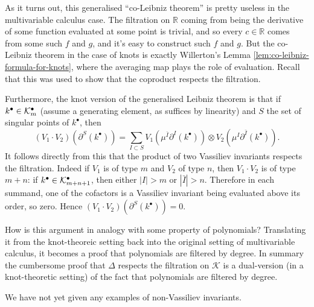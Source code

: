 \begin{remark}
	As it turns out, this generalised ``co-Leibniz theorem'' is pretty useless in the multivariable calculus case. The filtration on \(\mathbb{R}\) coming from being the derivative of some function evaluated at some point is trivial, and so every \(c \in \mathbb{R}\) comes from some such \(f\) and \(g\), and it's easy to construct such \(f\) and \(g\). But the co-Leibniz theorem in the case of knots is exactly Willerton's Lemma \ref{lem:co-leibniz-formula-for-knots}, where the averaging map plays the role of evaluation. Recall that this was used to show that the coproduct respects the filtration.

	Furthermore, the knot version of the generalised Leibniz theorem \cite{vassiliev-invariants-and-the-hopf-algebra-of-chord-diagrams} is that if \(k^{\bullet} \in \mathcal{K}^{\bullet}_{m}\) (assume a generating element, as suffices by linearity) and \(S\) the set of singular points of \(k^{\bullet}\), then
	\[
		(V_{1} \cdot V_{2})(\partial^{S}(k^{\bullet}))
		=
		\sum_{I \subset S}
		V_{1}(\mu^{\bar{I}}\partial^{I}(k^{\bullet}))
		\otimes
		V_{2}(\mu^{I}\partial^{\bar{I}}(k^{\bullet})).
	\]
	It follows directly from this that the product of two Vassiliev invariants respects the filtration. Indeed if \(V_{1}\) is of type \(m\) and \(V_{2}\) of type \(n\), then \(V_{1} \cdot V_{2}\) is of type \(m + n\): if \(k^{\bullet} \in \mathcal{K}^{\bullet}_{m + n + 1}\), then either \(|I| > m\) or \(|\bar{I}| > n\). Therefore in each summand, one of the cofactors is a Vassiliev invariant being evaluated above its order, so zero. Hence \((V_{1} \cdot V_{2})(\partial^{S}(k^{\bullet})) = 0\).

	How is this argument in analogy with some property of polynomials? Translating it from the knot-theoreic setting back into the original setting of multivariable calculus, it becomes a proof that polynomials are filtered by degree. In summary the cumbersome proof that \(\Delta\) respects the filtration on \(\mathcal{K}\) is a dual-version (in a knot-theoretic setting) of the fact that polynomials are filtered by degree.
\end{remark}

We have not yet given any examples of non-Vassiliev invariants.

